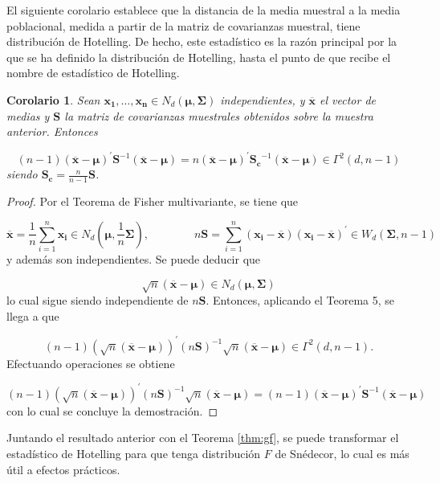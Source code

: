 \documentclass[
  a4paper,
  oneside]{scrbook}
\newtheorem{corollary}{Corolario}[chapter]
\theoremstyle{definition}
\theoremstyle{definition}
\theoremstyle{definition}
\theoremstyle{definition}
\theoremstyle{remark}
\begin{document}
El siguiente corolario establece que la distancia de la media muestral a
la media poblacional, medida a partir de la matriz de covarianzas
muestral, tiene distribución de Hotelling. De hecho, este estadístico es
la razón principal por la que se ha definido la distribución de
Hotelling, hasta el punto de que recibe el nombre de estadístico de
Hotelling.

\begin{corollary}
\protect\hypertarget{cor:unnamed-chunk-108}{}\label{cor:unnamed-chunk-108}Sean \(\bm{x_1},\ldots, \bm{x_n}\in N_d(\bm\mu,\bm\Sigma)\)
independientes, y \(\overline{\bm{x}}\) el vector de medias y \(\bm{S}\) la
matriz de covarianzas muestrales obtenidos sobre la muestra anterior.
Entonces

\[(n-1) \left(\overline{\bm{x}}-\bm\mu\right)^{\prime} \bm{S}^{-1} \left(\overline{\bm{x}}-\bm\mu\right)
=n \left(\overline{\bm{x}}-\bm\mu\right)^{\prime} \bm{S_c}^{-1} \left(\overline{\bm{x}}-\bm\mu\right)
\in \Gamma^2(d,n-1)\] siendo \(\bm{S_c}=\frac{n}{n-1}\bm{S}\).
\end{corollary}

\begin{proof}
Por el Teorema de Fisher multivariante, se tiene
que

\[\overline{\bm{x}}=\frac{1}{n}\sum_{i=1}^n \bm{x_i} \in N_d\left(\bm{\mu},\frac{1}{n}\bm\Sigma\right),
\qquad\qquad n\bm{S}=\sum_{i=1}^n \left(\bm{x_i}-\overline{\bm{x}}\right)\left(\bm{x_i}-\overline{\bm{x}}\right)^\prime{}
\in W_d\left(\bm\Sigma,n-1\right)\] y además son independientes. Se
puede deducir que

\[\sqrt{n}\left(\overline{\bm{x}}-\bm{\mu}\right)\in N_d\left(\bm{\mu},\bm\Sigma\right)\]
lo cual sigue siendo independiente de \(n\bm{S}\). Entonces, aplicando el
Teorema 5, se llega a que

\[(n-1)\left(\sqrt{n}\left(\overline{\bm{x}}-\bm{\mu}\right)\right)^\prime{}(n\bm{S})^{-1}
\sqrt{n}\left(\overline{\bm{x}}-\bm{\mu}\right)\in \Gamma^2(d,n-1).\]
Efectuando operaciones se obtiene

\[(n-1)\left(\sqrt{n}\left(\overline{\bm{x}}-\bm{\mu}\right)\right)^\prime{} (n\bm{S})^{-1}
\sqrt{n}\left(\overline{\bm{x}}-\bm{\mu}\right)=(n-1) \left(\overline{\bm{x}}-\bm{\mu}\right)^{\prime} \bm{S}^{-1} \left(\overline{\bm{x}}-\bm{\mu}\right)\]
con lo cual se concluye la demostración.
\end{proof}

Juntando el resultado anterior con el Teorema \ref{thm:gf}, se puede transformar el
estadístico de Hotelling para que tenga distribución \(F\) de Snédecor, lo
cual es más útil a efectos prácticos.
\end{document}
